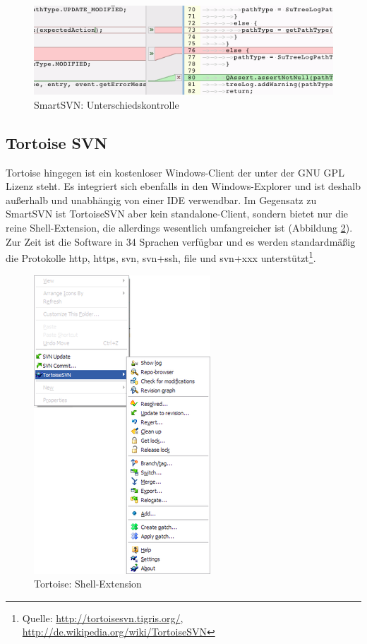 \begin{figure}[!htb]
        \centering
        \includegraphics[width=.9\textwidth]{3_smartsvn3.png}
        \caption{SmartSVN: Unterschiedskontrolle}
        \label{fig:smart3}
\end{figure}
\subsection{Tortoise SVN}
Tortoise hingegen ist ein kostenloser Windows-Client der unter der GNU GPL Lizenz steht. Es integriert sich ebenfalls in den Windows-Explorer und ist deshalb außerhalb und unabhängig von einer IDE verwendbar. Im Gegensatz zu SmartSVN ist TortoiseSVN aber kein standalone-Client, sondern bietet nur die reine Shell-Extension, die allerdings wesentlich umfangreicher ist (Abbildung \ref{fig:tortoise1}).
Zur Zeit ist die Software in 34 Sprachen verfügbar und es werden standardmäßig die Protokolle http, https, svn, svn+ssh, file und svn+xxx unterstützt\footnote{Quelle: \url{http://tortoisesvn.tigris.org/}, \url{http://de.wikipedia.org/wiki/TortoiseSVN}}.
\begin{figure}[!htb]
	\centering
	\includegraphics[width=.45\textwidth]{4_turtoise1.png}
	\caption{Tortoise: Shell-Extension}
	\label{fig:tortoise1}
\end{figure}  
